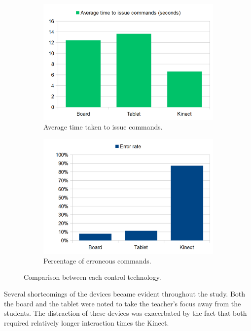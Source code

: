 \documentclass[link]{IWCOMP}
\begin{document}
\begin{figure}[t]
	\centering
	\begin{subfigure}[t]{0.45\textwidth}
		\centering
		\includegraphics[width=\textwidth]{figures/bar_chart_average_time.png}
		\caption{Average time taken to issue commands.}
		\label{fig:averageTime}
	\end{subfigure}
	\begin{subfigure}[t]{0.45\textwidth}
		\centering
		\includegraphics[width=\textwidth]{figures/bar_chart_error_rate.png}
		\caption{Percentage of erroneous commands.}
		\label{fig:errorRates}
	\end{subfigure}
   	\caption{Comparison between each control technology.}
   	\label{fig:graphs}
\end{figure} 

Several shortcomings of the devices became evident throughout the study.
Both the board and the tablet were noted to take the teacher's focus away from the students.
The distraction of these devices was exacerbated by the fact that both required relatively longer interaction times the Kinect.
\end{document}
